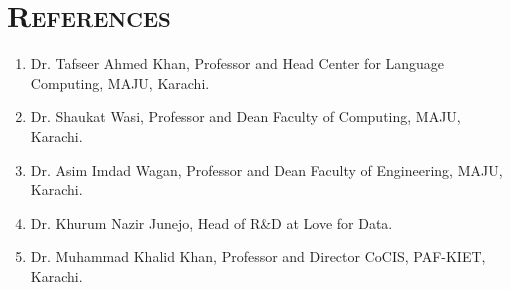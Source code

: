 \documentclass[a4paper, 10pt]{article}
\begin{document}
\section*{\normalfont\textsc{References}}
\begin{enumerate}
\itemsep-4pt
 \item Dr. Tafseer Ahmed Khan, Professor and Head Center for Language Computing, MAJU, Karachi.
 \item Dr. Shaukat Wasi, Professor and Dean Faculty of Computing, MAJU, Karachi.
 \item Dr. Asim Imdad Wagan, Professor and Dean Faculty of Engineering, MAJU, Karachi.
 \item Dr. Khurum Nazir Junejo, Head of R\&D at Love for Data.
 \item Dr. Muhammad Khalid Khan, Professor and Director CoCIS, PAF-KIET, Karachi.
\end{enumerate}
\end{document}
